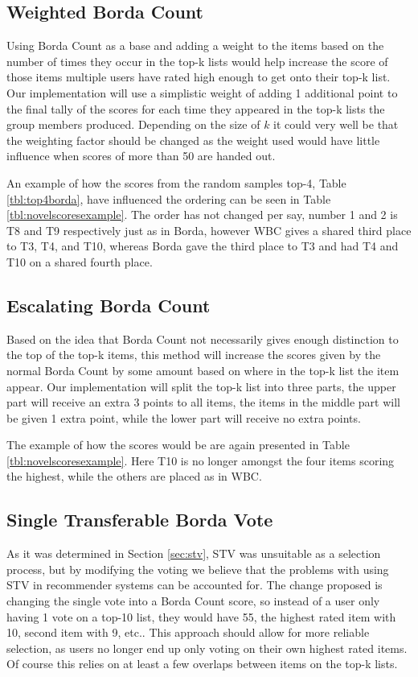 \subsection{Weighted Borda Count}
Using Borda Count as a base and adding a weight to the items based on the number of times they occur in the top-k lists would help increase the score of those items multiple users have rated high enough to get onto their top-k list. Our implementation will use a simplistic weight of adding 1 additional point to the final tally of the scores for each time they appeared in the top-k lists the group members produced. Depending on the size of $k$ it could very well be that the weighting factor should be changed as the weight used would have little influence when scores of more than 50 are handed out.

An example of how the scores from the random samples top-4, Table \ref{tbl:top4borda}, have influenced the ordering can be seen in Table \ref{tbl:novelscoresexample}. The order has not changed per say, number 1 and 2 is T8 and T9 respectively just as in Borda, however WBC gives a shared third place to T3, T4, and T10, whereas Borda gave the third place to T3 and had T4 and T10 on a shared fourth place. 

\subsection{Escalating Borda Count}
Based on the idea that Borda Count not necessarily gives enough distinction to the top of the top-k items, this method will increase the scores given by the normal Borda Count by some amount based on where in the top-k list the item appear. Our implementation will split the top-k list into three parts, the upper part will receive an extra 3 points to all items, the items in the middle part will be given 1 extra point, while the lower part will receive no extra points.

The example of how the scores would be are again presented in Table \ref{tbl:novelscoresexample}. Here T10 is no longer amongst the four items scoring the highest, while the others are placed as in WBC.

\subsection{Single Transferable Borda Vote} \label{STBV}
As it was determined in Section \ref{sec:stv}, STV was unsuitable as a selection process, but by modifying the voting we believe that the problems with using STV in recommender systems can be accounted for. The change proposed is changing the single vote into a Borda Count score, so instead of a user only having 1 vote on a top-10 list, they would have 55, the highest rated item with 10, second item with 9, etc.. This approach should allow for more reliable selection, as users no longer end up only voting on their own highest rated items. Of course this relies on at least a few overlaps between items on the top-k lists.\\

